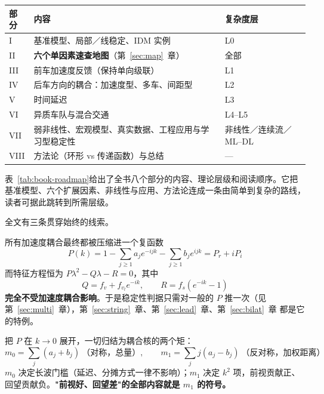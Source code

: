 \documentclass[11pt,a4paper,openany]{book}
\numberwithin{equation}{chapter}
\numberwithin{figure}{chapter}
\numberwithin{table}{chapter}
\newcommand{\tabletext}[2]{%
  \par\smallskip\noindent
  表~\ref{#1}给出了#2
  \par\smallskip
}
\begin{document}
\begin{center}
\small
{}
\label{tab:book-roadmap}
\begin{tabular}{p{2.0cm}p{5.2cm}p{6.6cm}}
\toprule
\textbf{部分} & \textbf{内容} & \textbf{复杂度层} \\
\midrule
I & 基准模型、局部／线稳定、IDM 实例 & L0 \\
II & \textbf{六个单因素速查地图}（第~\ref{sec:map}~章） & 全部 \\
III & 前车加速度反馈（保持单向级联） & L1 \\
IV & 后车方向的耦合：加速度型、多车、间距型 & L2 \\
V & 时间延迟 & L3 \\
VI & 异质车队与混合交通 & L4--L5 \\
VII & 弱非线性、宏观模型、真实数据、工程应用与学习型稳定性 & 非线性／连续流／ML--DL \\
VIII & 方法论（环形 vs 传递函数）与总结 & — \\
\bottomrule
\end{tabular}
\end{center}
\tabletext{tab:book-roadmap}{全书八个部分的内容、理论层级和阅读顺序。它把基准模型、六个扩展因素、非线性与应用、方法论连成一条由简单到复杂的路线，读者可据此跳转到所需层级。}

全文有三条贯穿始终的线索。

\begin{tcolorbox}[keybox,title=\textbf{线索一：统一的代数结构}]
所有加速度耦合最终都被压缩进一个复函数
\[
P(k) = 1 - \sum_{j\ge1}a_j e^{-ijk} - \sum_{j\ge1}b_j e^{ijk} = P_r + iP_i
\]
而特征方程恒为 $P\lambda^2 - Q\lambda - R = 0$，其中
\[
Q = f_v + f_{v_l}e^{-ik},\qquad R = f_s\left(e^{-ik}-1\right)
\]
\textbf{完全不受加速度耦合影响}。于是稳定性判据只需对一般的 $P$ 推一次（见 第~\ref{sec:multi}~章），第~\ref{sec:string}~章、第~\ref{sec:lead}~章、第~\ref{sec:bilat}~章 都是它的特例。
\end{tcolorbox}

\begin{tcolorbox}[keybox,title=\textbf{线索二：零阶矩管长波，一阶矩管有限波长}]
把 $P$ 在 $k\to0$ 展开，一切归结为耦合核的两个矩：
\[
m_0 = \sum_j\left(a_j+b_j\right)\ \text{（对称，总量）},
\qquad
m_1 = \sum_j j\left(a_j-b_j\right)\ \text{（反对称，加权距离）}
\]
$m_0$ 决定长波门槛（延迟、分摊方式一律不影响）；$m_1$ 决定 $k^2$ 项，前视贡献正、回望贡献负。\textbf{"前视好、回望差"的全部内容就是 $m_1$ 的符号。}
\end{tcolorbox}
\end{document}
